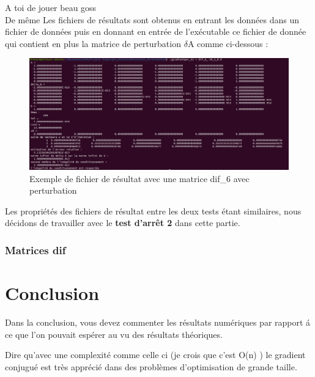 \documentclass[12,french]{report}
\begin{document}
A toi de jouer beau goss \\
De même Les fichiers de résultats sont obtenus en entrant les données dans un fichier de données puis en donnant en entrée de l’exécutable ce fichier de donnée qui contient en plus la matrice de perturbation $\delta$A comme ci-dessous :
\begin{figure}[H]
	\centering
	\includegraphics[width=1\textwidth]{./Images/dif_6_1.res}
	\caption{Exemple de fichier de résultat avec une matrice dif\_6 avec perturbation}
\end{figure}

Les propriétés des fichiers de résultat entre les deux tests étant similaires, nous décidons de travailler avec le \textbf{test d'arrêt 2} dans cette partie.

\subsection{Matrices dif}


\chapter*{Conclusion}

Dans la conclusion, vous devez commenter les résultats numériques par rapport á ce que l’on pouvait espérer au vu des résultats théoriques.

Dire qu'avec une complexité comme celle ci (je crois que c'est O(n) ) le gradient conjugué est très apprécié dans des problèmes d'optimisation de grande taille.
\end{document}
